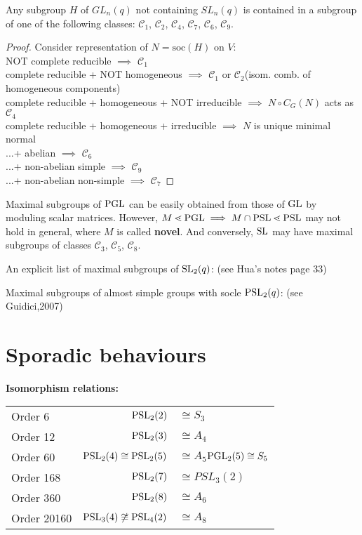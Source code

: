 \documentclass[a4paper,11pt]{article}
\def\subtitle#1{\section{#1}}
\begin{document}
\begin{theorem}
    Any subgroup $H$ of $GL_n(q)$ not containing $SL_n(q)$ is contained in a subgroup of one of the following classes: $\mathscr{C}_1$, $\mathscr{C}_2$,  $\mathscr{C}_4$,   $\mathscr{C}_7$, $\mathscr{C}_6$, $\mathscr{C}_9$.
\end{theorem}
\begin{proof} Consider representation of $N=\mathrm{soc}(H)$ on $V$:\\
    NOT complete reducible $\implies$ $\mathscr{C}_1$\\
    complete reducible + NOT homogeneous $\implies$ $\mathscr{C}_1$ or $\mathscr{C}_2$(isom. comb. of homogeneous components)\\
    complete reducible + homogeneous + NOT irreducible $\implies$ $N\circ C_G(N)$ acts as  $\mathscr{C}_4$\\
    complete reducible + homogeneous + irreducible $\implies$ $N$ is unique minimal normal\\
    ...+ abelian $\implies$ $\mathscr{C}_6$\\
    ...+ non-abelian simple $\implies$ $\mathscr{C}_9$\\
    ...+ non-abelian non-simple $\implies$ $\mathscr{C}_7$
\end{proof}


Maximal subgroups of $\mathrm{PGL}$ can be easily obtained from those of $\mathrm{GL}$ by moduling scalar matrices. However, $M\lessdot \mathrm{PGL}\implies M\cap \mathrm{PSL}\lessdot \mathrm{PSL}$ may not hold in general, where $M$ is called \textbf{novel}. And conversely, $\mathrm{SL}$ may have maximal subgroups of classes $\mathscr{C}_3$, $\mathscr{C}_5$, $\mathscr{C}_8$.

An explicit list of maximal subgroups of $\mathrm{SL}_2(q)$: (see Hua's notes page 33)

Maximal subgroups of almost simple groups with socle $\mathrm{PSL}_2(q)$: (see Guidici,2007)



\subtitle{Sporadic behaviours}


\noindent\textbf{Isomorphism relations:}  
\begin{table}[htbp]
    \centering
    \begin{tabular}{lrl}
        Order 6 & $\mathrm{PSL}_2(2)$&$\cong S_3$\\
        Order 12 & $\mathrm{PSL}_2(3)$&$\cong A_4$\\
        Order 60 & $\mathrm{PSL}_2(4)\cong\mathrm{PSL}_2(5)$ &$\cong A_5$\qquad $\mathrm{PGL}_2(5)\cong S_5$\\
        Order 168 & $\mathrm{PSL}_2(7)$ &$\cong PSL_3(2)$\\
        Order 360 & $\mathrm{PSL}_2(8)$ &$\cong A_6$\\
        Order 20160 & $\mathrm{PSL}_3(4)\not\cong\mathrm{PSL}_4(2)$ &$\cong A_{8}$\\
    \end{tabular}
\end{table}
\end{document}
